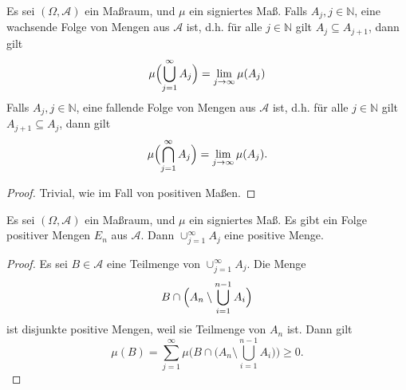 \documentclass[/Users/zhangwusheng/Documents/satz von radon nikodym/satz von radon nikodym.tex]{subfiles}
\begin{document}
    \begin{mdframed}[style=mdfexample]
        \begin{lemma}\label{lem:1}
            Es sei $(\Omega, \mathcal{A})$ ein Maßraum, und $\mu$ ein signiertes Maß. Falls $A_j, j \in \mathbb{N}$, eine wachsende Folge von Mengen aus $\mathcal{A}$ ist, 
            d.h. für alle $j \in \mathbb{N}$ gilt $A_j \subseteq A_{j+1}$, dann gilt
            \[\mu \Bigl(\bigcup_{j=1}^\infty A_j\Bigr) =\lim_{j \to \infty} \mu(A_j)\]
            Falls $A_j, j \in \mathbb{N}$, eine fallende Folge von Mengen aus $\mathcal{A}$ ist, d.h. für alle $j \in \mathbb{N}$ gilt $A_{j+1} \subseteq A_{j}$, dann gilt
            \[\mu \Bigl(\bigcap_{j=1}^\infty A_j\Bigr)=\lim_{j \to \infty} \mu(A_j).\]
        \end{lemma}
    \end{mdframed}
    \begin{proof}
        Trivial, wie im Fall von positiven Maßen. 
    \end{proof}

    \begin{mdframed}[style=mdfexample]
        \begin{lemma}\label{lem:2}
            Es sei $(\Omega, \mathcal{A})$ ein Maßraum, und $\mu$ ein signiertes Maß. Es gibt ein Folge positiver Mengen $E_{n}$ aus $\mathcal{A}$. 
            Dann $\cup_{j=1}^\infty A_j$ eine positive Menge.
        \end{lemma}
    \end{mdframed}
    \begin{proof}
        Es sei $B \in \mathcal{A}$ eine Teilmenge von $\cup_{j=1}^\infty A_j$. Die Menge
        \[B \cap \Bigl(A_n \setminus \bigcup_{i=1}^{n-1} A_i \Bigr)\]
        ist disjunkte positive Mengen, weil sie Teilmenge von $A_n$ ist. Dann gilt
        \[\mu(B)=\sum_{j=1}^\infty \mu \Biggl(B \cap \Biggl(A_n \setminus \bigcup_{i=1}^{n-1} A_i \Bigr)\Biggr) \geq 0.\]
    \end{proof}
\end{document}
